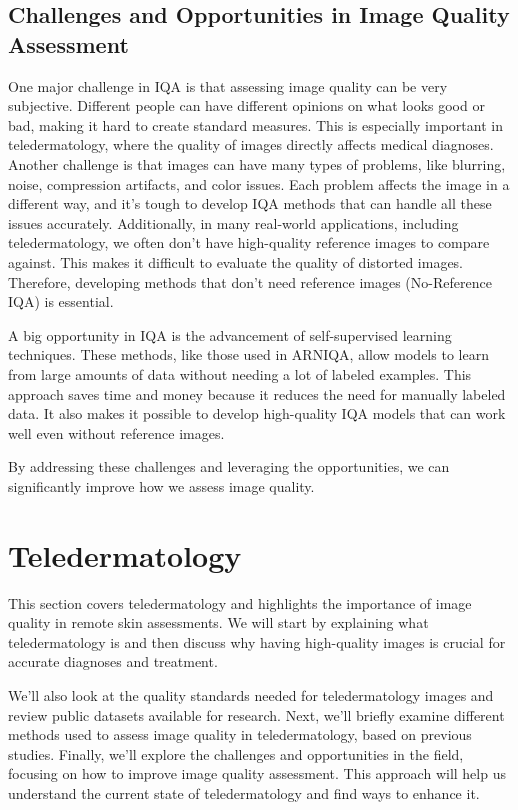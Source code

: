 \subsection{Challenges and Opportunities in Image Quality Assessment}
\label{sub:ChallengesOpportunitiesIQA}
One major challenge in IQA is that assessing image quality can be very subjective. Different people can have different opinions on what looks good or bad, making it hard to create standard measures. This is especially important in teledermatology, where the quality of images directly affects medical diagnoses. Another challenge is that images can have many types of problems, like blurring, noise, compression artifacts, and color issues. Each problem affects the image in a different way, and it’s tough to develop IQA methods that can handle all these issues accurately. Additionally, in many real-world applications, including teledermatology, we often don’t have high-quality reference images to compare against. This makes it difficult to evaluate the quality of distorted images. Therefore, developing methods that don’t need reference images (No-Reference IQA) is essential.\par
\vspace{\baselineskip}
\noindent
A big opportunity in IQA is the advancement of self-supervised learning techniques. These methods, like those used in ARNIQA, allow models to learn from large amounts of data without needing a lot of labeled examples. This approach saves time and money because it reduces the need for manually labeled data. It also makes it possible to develop high-quality IQA models that can work well even without reference images. \par
\vspace{\baselineskip}
\noindent
By addressing these challenges and leveraging the opportunities, we can significantly improve how we assess image quality. \par
\clearpage

\section{Teledermatology}
\label{sec:Teledermatology}
This section covers teledermatology and highlights the importance of image quality in remote skin assessments. We will start by explaining what teledermatology is and then discuss why having high-quality images is crucial for accurate diagnoses and treatment. \par
\vspace{\baselineskip}
\noindent
We’ll also look at the quality standards needed for teledermatology images and review public datasets available for research. Next, we’ll briefly examine different methods used to assess image quality in teledermatology, based on previous studies. Finally, we’ll explore the challenges and opportunities in the field, focusing on how to improve image quality assessment. This approach will help us understand the current state of teledermatology and find ways to enhance it.\par

